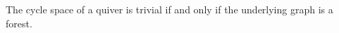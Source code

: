 \begin{corollary}\label{Arden24-cor-3.2}
\label{Arden24-cor:forest}
The cycle space of a quiver is trivial if and only if the underlying graph is a forest.
\end{corollary}